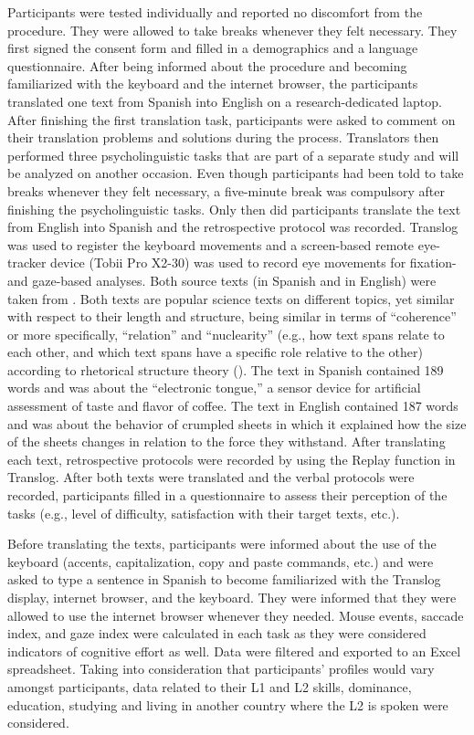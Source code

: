 \documentclass[output=paper]{langscibook}
\begin{document}
Participants were tested individually and reported no discomfort from the procedure. They were allowed to take breaks whenever they felt necessary. They first signed the consent form and filled in a demographics and a language questionnaire. After being informed about the procedure and becoming familiarized with the keyboard and the internet browser, the participants translated one text from Spanish into English on a research-dedicated laptop. After finishing the first translation task, participants were asked to comment on their translation problems and solutions during the process. Translators then performed three psycholinguistic tasks that are part of a separate study and will be analyzed on another occasion. Even though participants had been told to take breaks whenever they felt necessary, a five-minute break was compulsory after finishing the psycholinguistic tasks. Only then did participants translate the text from English into Spanish and the retrospective protocol was recorded. Translog was used to register the keyboard movements and a screen-based remote eye-tracker device (Tobii Pro X2-30) was used to record eye movements for fixation- and gaze-based analyses. Both source texts (in Spanish and in English) were taken from \citet{ferreira2016cognitive}. Both texts are popular science texts on different topics, yet similar with respect to their length and structure, being similar in terms of ``coherence'' or more specifically, ``relation'' and ``nuclearity'' (e.g., how text spans relate to each other, and which text spans have a specific role relative to the other) according to rhetorical structure theory (\citealt{taboada2006rhetorical}). The text in Spanish contained 189 words and was about the “electronic tongue,” a sensor device for artificial assessment of taste and flavor of coffee. The text in English contained 187 words and was about the behavior of crumpled sheets in which it explained how the size of the sheets changes in relation to the force they withstand. After translating each text, retrospective protocols were recorded by using the Replay function in Translog. After both texts were translated and the verbal protocols were recorded, participants filled in a questionnaire to assess their perception of the tasks (e.g., level of difficulty, satisfaction with their target texts, etc.).

Before translating the texts, participants were informed about the use of the keyboard (accents, capitalization, copy and paste commands, etc.) and were asked to type a sentence in Spanish to become familiarized with the Translog display, internet browser, and the keyboard. They were informed that they were allowed to use the internet browser whenever they needed. Mouse events, saccade index, and gaze index were calculated in each task as they were considered indicators of cognitive effort as well. Data were filtered and exported to an Excel spreadsheet. Taking into consideration that participants’ profiles would vary amongst participants, data related to their L1 and L2 skills, dominance, education, studying and living in another country where the L2 is spoken were considered.\largerpage[2]
\end{document}
